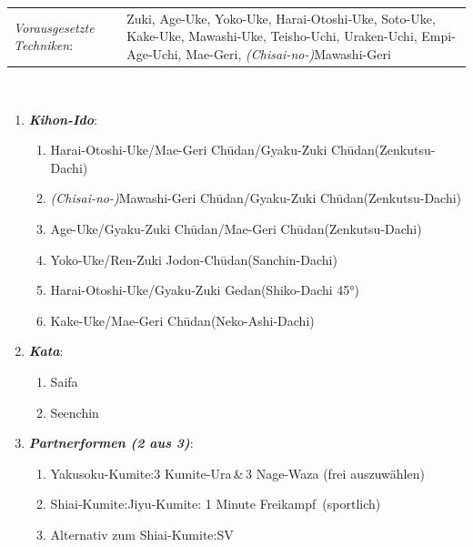 \documentclass[a5paper,landscape,DIV=calc,11pt,notitlepage]{scrartcl}
\begin{document}
\begin{tcolorbox}[colback=white,colframe=BLBELT,coltitle=white,title=4. Kyu: Blau]
	\renewcommand{\labelenumi}{\alph{enumi}.)}
	\renewcommand{\labelenumii}{\arabic*.}
	{\scriptsize
	\begin{tabularx}{\textwidth}{lX}
		\textit{Vorausgesetzte Techniken}:& Zuki, Age-Uke, Yoko-Uke, Harai-Otoshi-Uke, Soto-Uke, Kake-Uke, Mawashi-Uke, Teisho-Uchi, Uraken-Uchi, \mbox{Empi-Age-Uchi}, Mae-Geri, \textit{(Chisai-no-)}Mawashi-Geri
	\end{tabularx}\\}
	\begin{enumerate}[nosep]
		\item \textit{\textbf{Kihon-Ido}}:
		\begin{enumerate}[nosep]
			\item Harai-Otoshi-Uke/Mae-Geri Ch\={u}dan/Gyaku-Zuki Ch\={u}dan\tabto{280pt}(Zenkutsu-Dachi)
			\item \textit{(Chisai-no-)}Mawashi-Geri Ch\={u}dan/Gyaku-Zuki Ch\={u}dan\tabto{280pt}(Zenkutsu-Dachi)
			\item Age-Uke/Gyaku-Zuki Ch\={u}dan/Mae-Geri Ch\={u}dan\tabto{280pt}(Zenkutsu-Dachi)
			\item Yoko-Uke/Ren-Zuki Jodon-Ch\={u}dan\tabto{280pt}(Sanchin-Dachi)
			\item Harai-Otoshi-Uke/Gyaku-Zuki Gedan\tabto{280pt}(Shiko-Dachi 45°)
			\item Kake-Uke/Mae-Geri Ch\={u}dan\tabto{280pt}(Neko-Ashi-Dachi)
		\end{enumerate}
		\item \textit{\textbf{Kata}}:
		\begin{enumerate}[nosep]
			\item Saifa
			\item Seenchin
		\end{enumerate}
		\item \textit{\textbf{Partnerformen (2 aus 3)}}:
		\begin{enumerate}[nosep]
			\item Yakusoku-Kumite:\tabto{200pt}3 Kumite-Ura\,\&\,3 Nage-Waza (frei auszuwählen)
			\item Shiai-Kumite:\tabto{200pt}Jiyu-Kumite: 1 Minute \frqq Freikampf\flqq~(sportlich)
			\item Alternativ zum Shiai-Kumite:\tabto{200pt}SV
		\end{enumerate}
	\end{enumerate}
\end{tcolorbox}
\end{document}
